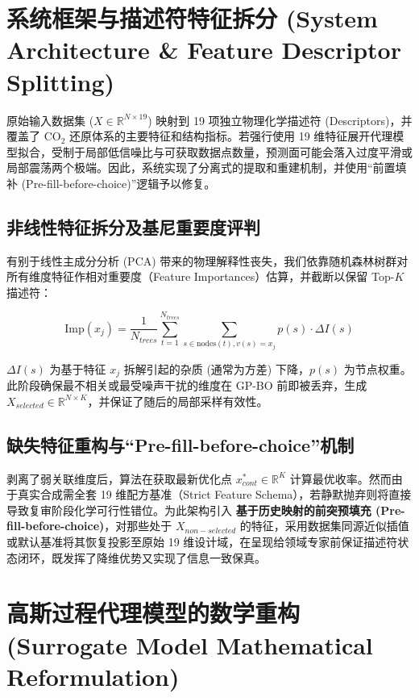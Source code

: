 \documentclass[12pt,a4paper]{article}
\begin{document}
\section{系统框架与描述符特征拆分 (System Architecture \& Feature Descriptor Splitting)}

原始输入数据集 ($X \in \mathbb{R}^{N \times 19}$) 映射到 19 项独立物理化学描述符 (Descriptors)，并覆盖了 CO$_2$ 还原体系的主要特征和结构指标。若强行使用 19 维特征展开代理模型拟合，受制于局部低信噪比与可获取数据点数量，预测面可能会落入过度平滑或局部震荡两个极端。因此，系统实现了分离式的提取和重建机制，并使用“前置填补 (Pre-fill-before-choice)”逻辑予以修复。

\subsection{非线性特征拆分及基尼重要度评判}
有别于线性主成分分析 (PCA) 带来的物理解释性丧失，我们依靠随机森林树群对所有维度特征作相对重要度（Feature Importances）估算，并截断以保留 Top-$K$ 描述符：

\begin{equation}
    \text{Imp}(x_j) = \frac{1}{N_{trees}} \sum_{t=1}^{N_{trees}} \sum_{s \in \text{nodes}(t), v(s) = x_j} p(s) \cdot \Delta I(s)
\end{equation}

$\Delta I(s)$ 为基于特征 $x_j$ 拆解引起的杂质 (通常为方差) 下降，$p(s)$ 为节点权重。此阶段确保最不相关或最受噪声干扰的维度在 GP-BO 前即被丢弃，生成 $X_{selected} \in \mathbb{R}^{N \times K}$，并保证了随后的局部采样有效性\cite{turbo2019}。

\subsection{缺失特征重构与“Pre-fill-before-choice”机制}
剥离了弱关联维度后，算法在获取最新优化点 $x^*_{cont} \in \mathbb{R}^K$ 计算最优收率。然而由于真实合成需全套 19 维配方基准（Strict Feature Schema），若静默抛弃则将直接导致复审阶段化学可行性错位。为此架构引入 \textbf{基于历史映射的前突预填充 (Pre-fill-before-choice)}，对那些处于 $X_{non-selected}$ 的特征，采用数据集同源近似插值或默认基准将其恢复投影至原始 19 维设计域，在呈现给领域专家前保证描述符状态闭环，既发挥了降维优势又实现了信息一致保真。



\section{高斯过程代理模型的数学重构 (Surrogate Model Mathematical Reformulation)}
\end{document}
